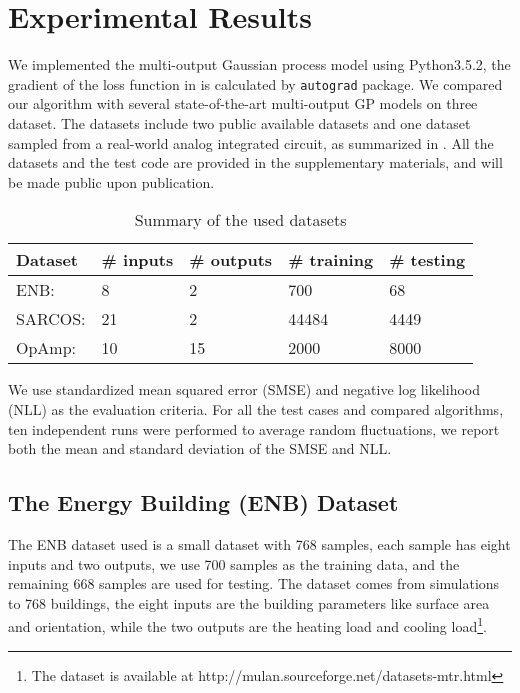 \section{Experimental Results}\label{sec:report}


We implemented the multi-output Gaussian process model using Python3.5.2, the gradient of the loss function in  is calculated by \texttt{autograd} package\cite{maclaurin2015autograd}. We compared our algorithm with several state-of-the-art multi-output GP models on three dataset. The datasets include two public available datasets and one dataset sampled from a real-world analog integrated circuit, as summarized in . All the datasets and the test code are provided in the supplementary materials, and will be made public upon publication.

\begin{table}[!htb]
    \centering
    \caption{Summary of the used datasets}
    \label{tab:datasets}
    \begin{tabular}{lllll}
        \toprule
        Dataset & \# inputs & \# outputs & \# training & \# testing \\ \midrule
        ENB:    & 8         & 2          & 700         & 68  \\
        SARCOS: & 21        & 2          & 44484       & 4449 \\
        OpAmp:  & 10        & 15         & 2000        & 8000 \\
        \bottomrule
    \end{tabular}
\end{table}
We use standardized mean squared error (SMSE) and negative log likelihood (NLL) as the evaluation criteria. For all the test cases and compared algorithms, ten independent runs were performed to average random fluctuations, we report both the mean and standard deviation of the SMSE and NLL.

\subsection{The Energy Building (ENB) Dataset}\label{sec:enb}

The ENB dataset used is a small dataset with 768 samples, each sample has eight inputs and two outputs, we use 700 samples as the training data, and the remaining 668 samples are used for testing. The dataset comes from simulations to 768 buildings\cite{spyromitros2016multi, tsanas2012accurate}, the eight inputs are the building parameters like surface area and orientation, while the two outputs are the heating load and cooling load\footnote{The dataset is available at http://mulan.sourceforge.net/datasets-mtr.html}.

